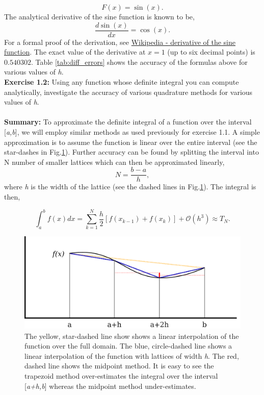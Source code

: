 \documentclass[10pt]{article}
\begin{document}
\[
	F(x) = \sin(x).
\]
The analytical derivative of the sine function is known to be,
\[
	\frac{d \sin(x)}{dx} = \cos(x).
\]
For a formal proof of the derivation, see \href{https://en.wikipedia.org/wiki/Differentiation_of_trigonometric_functions#Derivative_of_the_sine_function}{Wikipedia - derivative of the sine function}. The exact value of the derivative at $x=1$ (up to six decimal points) is $0.540302$. Table \ref{tab:diff_errors} shows the accuracy of the formulas above for various values of \textit{h}. \\
\newpage \noindent
\textbf{Exercise 1.2:} Using any function whose definite integral you can compute analytically, investigate the accuracy of various quadrature methods for various values of \textit{h}. \\
\\
\textbf{Summary:}
To approximate the definite integral of a function over the interval [\textit{a,b}], we will employ similar methods as used previously for exercise 1.1. A simple approximation is to assume the function is linear over the entire interval (see the star-dashes in Fig.\ref{fig:interpolation}). Further accuracy can be found by splitting the interval into N number of smaller lattices which can then be approximated linearly,
\[
	N = \frac{b-a}{h},
\]
where \textit{h} is the width of the lattice (see the dashed lines in Fig.\ref{fig:interpolation}). The integral is then,

\begin{equation}
	\int^b_a f(x)dx = \sum^N_{k=1} \frac{h}{2}[f(x_{k-1})+f(x_k)] + \mathcal{O}(h^3) \approx T_N.
	\label{eq:trapezoid}
\end{equation}

\begin{figure}[!h]
    \begin{center}
	\includegraphics[width=\columnwidth]{interpolation.png}
	\caption{The yellow, star-dashed line show shows a linear interpolation of the function over the full domain. The blue, circle-dashed line shows a linear interpolation of the function with lattices of width \textit{h}. The red, dashed line shows the midpoint method. It is easy to see the trapezoid method over-estimates the integral over the interval [\textit{a+h,b}] whereas the midpoint method under-estimates.}
	\label{fig:interpolation}
	\end{center}
\end{figure}
    
\end{document}
